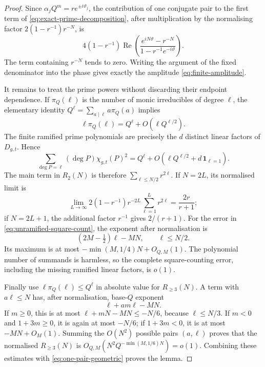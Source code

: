 \begin{proof}
Since \(\alpha_jQ^m=re^{\pm i\vartheta_j}\), the contribution of one
conjugate pair to the first term of
\eqref{eq:exact-prime-decomposition}, after multiplication by the normalising
factor \(2(1-r^{-1})r^{-N}\), is
\begin{equation}
 4(1-r^{-1})
 \operatorname{Re}\left(
   \frac{e^{iN\vartheta}-r^{-N}}
        {1-r^{-1}e^{-i\vartheta}}
 \right).
\label{eq:one-pair-geometric}
\end{equation}
The term containing \(r^{-N}\) tends to zero.  Writing the argument of the
fixed denominator into the phase gives exactly the amplitude
\eqref{eq:finite-amplitude}.

It remains to treat the prime powers without discarding their endpoint
dependence.  If \(\pi_Q(\ell)\) is the number of monic irreducibles of degree
\(\ell\), the elementary identity
\(Q^\ell=\sum_{a\mid\ell}a\pi_Q(a)\) implies
\begin{equation}
 \ell\pi_Q(\ell)=Q^\ell+O(\ell Q^{\ell/2}).
\label{eq:prime-polynomial}
\end{equation}
The finite ramified prime polynomials are precisely the \(d\) distinct linear factors of
\(D_{g,t}\).  Hence
\begin{equation}
 \sum_{\deg P=\ell}(\deg P)\chi_{g,t}(P)^2
 =Q^\ell+O(\ell Q^{\ell/2}+d\,\mathbf1_{\ell=1}).
\label{eq:unramified-square-count}
\end{equation}
The main term in \(R_2(N)\) is therefore
\(\sum_{\ell\leq N/2}r^{2\ell}\).  If \(N=2L\), its normalised limit is
\[
 \lim_{L\to\infty}2(1-r^{-1})r^{-2L}
       \sum_{\ell=1}^{L}r^{2\ell}=\frac{2r}{r+1};
\]
if \(N=2L+1\), the additional factor \(r^{-1}\) gives \(2/(r+1)\).
For the error in \eqref{eq:unramified-square-count}, the exponent after
normalisation is
\[
 (2M-\tfrac12)\ell-MN,\qquad \ell\leq N/2.
\]
Its maximum is at most
\(-\min(M,1/4)N+O_{Q,M}(1)\).  The polynomial number of summands is
harmless, so the complete square-counting error, including the missing
ramified linear factors, is \(o(1)\).

Finally use \(\ell\pi_Q(\ell)\leq Q^\ell\) in absolute value for
\(R_{\geq3}(N)\).  A term with \(a\ell\leq N\) has, after normalisation,
base-\(Q\) exponent
\begin{equation}
 \ell+am\ell-MN.
\label{eq:higher-power-exponent}
\end{equation}
If \(m\geq0\), this is at most
\(\ell+mN-MN\leq-N/6\), because \(\ell\leq N/3\).  If \(m<0\) and
\(1+3m\geq0\), it is again at most \(-N/6\); if \(1+3m<0\), it is at
most \(-MN+O_M(1)\).  Summing the \(O(N^2)\) possible pairs
\((a,\ell)\) proves that the normalised \(R_{\geq3}(N)\) is
\(O_{Q,M}(N^2Q^{-\min(M,1/6)N})=o(1)\).  Combining these estimates with
\eqref{eq:one-pair-geometric} proves the lemma.
\end{proof}

